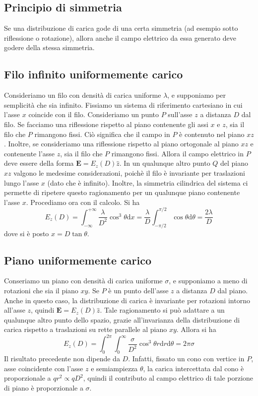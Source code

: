 \documentclass[a4paper,11pt]{book}
\newcommand{\dif}{\mathrm{d}}
\renewcommand{\vec}[1]{\mathbf{#1}}
\theoremstyle{theorem}
\theoremstyle{definition}
\begin{document}
\subsection{Principio di simmetria}
Se una distribuzione di carica gode di una certa simmetria (ad esempio sotto riflessione o rotazione), allora anche il campo elettrico da essa generato deve godere della stessa simmetria.
\subsection{Filo infinito uniformemente carico}
Consideriamo un filo con densità di carica uniforme $\lambda$, e supponiamo per semplicità che sia infinito. Fissiamo un sistema di riferimento cartesiano in cui l'asse $x$ coincide con il filo. Consideriamo un punto $P$ sull'asse $z$ a distanza $D$ dal filo. Se facciamo una riflessione rispetto al piano contenente gli assi $x$ e $z$, sia il filo che $P$ rimangono fissi. Ciò significa che il campo in $P$ è contenuto nel piano $xz$. Inoltre, se consideriamo una riflessione rispetto al piano ortogonale al piano $xz$ e contenente l'asse $z$, sia il filo che $P$ rimangono fissi. Allora il campo elettrico in $P$ deve essere della forma $\vec{E}=E_z(D)\hat{z}$. In un qualunque altro punto $Q$ del piano $xz$ valgono le medesime considerazioni, poichè il filo è invariante per traslazioni lungo l'asse $x$ (dato che è infinito). Inoltre, la simmetria cilindrica del sistema ci permette di ripetere questo ragionamento per un qualunque piano contenente l'asse $x$. Procediamo ora con il calcolo. Si ha
\[
	E_z(D)=\int_{-\infty}^{+\infty}\frac{\lambda}{D^2}\cos^3\theta\dif x=\frac{\lambda}{D}\int_{-\pi/2}^{\pi/2}\cos\theta\dif\theta=\frac{2\lambda}{D}
\]
dove si è posto $x=D\tan\theta$.
\subsection{Piano uniformemente carico}
Conseriamo un piano con densità di carica uniforme $\sigma$, e supponiamo a meno di rotazioni che sia il piano $xy$. Se $P$ è un punto dell'asse $z$ a distanza $D$ dal piano. Anche in questo caso, la distribuzione di carica è invariante per rotazioni intorno all'asse $z$, quindi $\vec{E}=E_z(D)\hat{z}$. Tale ragionamento si può adattare a un qualunque altro punto dello spazio, grazie all'invarianza della distribuzione di carica rispetto a traslazioni su rette parallele al piano $xy$. Allora si ha
\[
	E_z(D)=\int_{0}^{2\pi}\int_{0}^{\infty}\frac{\sigma}{D^2}\cos^3\theta r\dif r\dif\theta=2\pi\sigma
\]
Il risultato precedente non dipende da $D$. Infatti, fissato un cono con vertice in $P$, asse coincidente con l'asse $z$ e semiampiezza $\theta$, la carica intercettata dal cono è proporzionale a $qr^2\propto qD^2$, quindi il contributo al campo elettrico di tale porzione di piano è proporzionale a $\sigma$.
\end{document}
